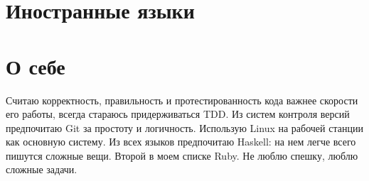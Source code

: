 \documentclass[11pt,a4paper,sans]{moderncv}        %
\begin{document}
  

\section{Иностранные языки}

\section{О себе}
Считаю корректность, правильность и протестированность кода важнее скорости его
работы, всегда стараюсь придерживаться TDD. Из систем контроля версий
предпочитаю Git за простоту и логичность. Использую Linux на рабочей станции как
основную систему. Из всех языков предпочитаю Haskell: на нем легче всего пишутся
сложные вещи. Второй в моем списке Ruby. Не люблю спешку, люблю сложные задачи.

\nocite{*}

\end{document}
